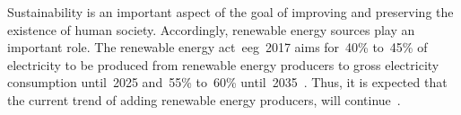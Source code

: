 % 
% 
\label{ch:wfcp}
\glsresetall
% 
Sustainability is an important aspect of the goal of improving and preserving
the existence of human society. Accordingly, renewable energy sources play an
important role. The renewable energy act~\acrshort{eeg}~2017 aims for~40\%
to~45\% of electricity to be produced from renewable energy producers to gross
electricity consumption until~2025 and~55\% to~60\%
until~2035~\parencite{online:juris-eeg2017-zweck-und-ziel-des-gesetzes}. Thus,
it is expected that the current trend of adding renewable energy producers, will
continue~\parencite{online:eeg2014,
online:iwr-offshore-windindustrie-future-europe-data, 969970}.

